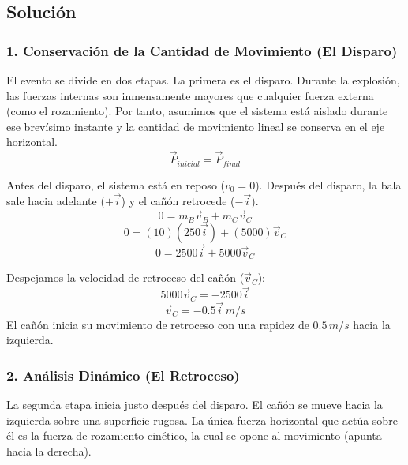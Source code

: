 \documentclass[12pt, a4paper]{article}
\begin{document}
\begin{center}
\end{center}

\subsection*{Solución}

\subsubsection*{1. Conservación de la Cantidad de Movimiento (El Disparo)}
El evento se divide en dos etapas. La primera es el disparo. Durante la explosión, las fuerzas internas son inmensamente mayores que cualquier fuerza externa (como el rozamiento). Por tanto, asumimos que el sistema está aislado durante ese brevísimo instante y la cantidad de movimiento lineal se conserva en el eje horizontal.
\[ \vec{P}_{inicial} = \vec{P}_{final} \]

Antes del disparo, el sistema está en reposo ($v_0 = 0$). Después del disparo, la bala sale hacia adelante ($+\vec{i}$) y el cañón retrocede ($-\vec{i}$).
\[ 0 = m_B \vec{v}_B + m_C \vec{v}_C \]
\[ 0 = (10)(250 \vec{i}) + (5000) \vec{v}_C \]
\[ 0 = 2500 \vec{i} + 5000 \vec{v}_C \]

Despejamos la velocidad de retroceso del cañón ($\vec{v}_C$):
\[ 5000 \vec{v}_C = -2500 \vec{i} \]
\[ \vec{v}_C = -0.5 \vec{i} \, \si{m/s} \]
El cañón inicia su movimiento de retroceso con una rapidez de $0.5 \, \si{m/s}$ hacia la izquierda.

\subsubsection*{2. Análisis Dinámico (El Retroceso)}
La segunda etapa inicia justo después del disparo. El cañón se mueve hacia la izquierda sobre una superficie rugosa. La única fuerza horizontal que actúa sobre él es la fuerza de rozamiento cinético, la cual se opone al movimiento (apunta hacia la derecha).
\end{document}
